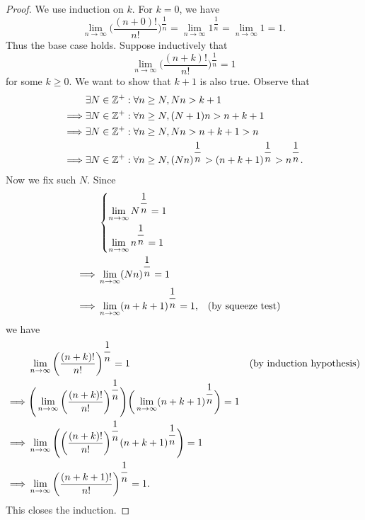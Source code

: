 \begin{proof}
  We use induction on \(k\).
  For \(k = 0\), we have
  \[
    \lim_{n \to \infty} \bigg(\dfrac{(n + 0)!}{n!}\bigg)^{\dfrac{1}{n}} = \lim_{n \to \infty} 1^{\dfrac{1}{n}} = \lim_{n \to \infty} 1 = 1.
  \]
  Thus the base case holds.
  Suppose inductively that
  \[
    \lim_{n \to \infty} \bigg(\dfrac{(n + k)!}{n!}\bigg)^{\dfrac{1}{n}} = 1
  \]
  for some \(k \geq 0\).
  We want to show that \(k + 1\) is also true.
  Observe that
  \begin{align*}
             & \exists N \in \mathbb{Z}^+ : \forall n \geq N, Nn > k + 1                                                           \\
    \implies & \exists N \in \mathbb{Z}^+ : \forall n \geq N, (N + 1)n > n + k + 1                                                 \\
    \implies & \exists N \in \mathbb{Z}^+ : \forall n \geq N, Nn > n + k + 1 > n                                                   \\
    \implies & \exists N \in \mathbb{Z}^+ : \forall n \geq N, (Nn)^{\dfrac{1}{n}} > (n + k + 1)^{\dfrac{1}{n}} > n^{\dfrac{1}{n}}.
  \end{align*}
  Now we fix such \(N\).
  Since
  \begin{align*}
             & \begin{dcases}
                 \lim_{n \to \infty} N^{\dfrac{1}{n}} = 1 \\ %
                 \lim_{n \to \infty} n^{\dfrac{1}{n}} = 1 %
               \end{dcases}                                \\
    \implies & \lim_{n \to \infty} (Nn)^{\dfrac{1}{n}} = 1                                                                          \\
    \implies & \lim_{n \to \infty} (n + k + 1)^{\dfrac{1}{n}} = 1,                                    &  & \text{(by squeeze test)}
  \end{align*}
  we have
  \begin{align*}
             & \lim_{n \to \infty} \bigg(\dfrac{(n + k)!}{n!}\bigg)^{\dfrac{1}{n}} = 1                                                                        &  & \text{(by induction hypothesis)} \\
    \implies & \Bigg(\lim_{n \to \infty} \bigg(\dfrac{(n + k)!}{n!}\bigg)^{\dfrac{1}{n}}\Bigg) \bigg(\lim_{n \to \infty} (n + k + 1)^{\dfrac{1}{n}}\bigg) = 1            \\
    \implies & \lim_{n \to \infty} \Bigg(\bigg(\dfrac{(n + k)!}{n!}\bigg)^{\dfrac{1}{n}} (n + k + 1)^{\dfrac{1}{n}}\Bigg) = 1                                            \\
    \implies & \lim_{n \to \infty} \bigg(\dfrac{(n + k + 1)!}{n!}\bigg)^{\dfrac{1}{n}} = 1.
  \end{align*}
  This closes the induction.
\end{proof}

